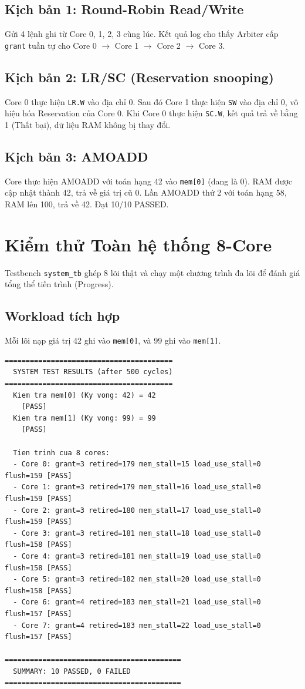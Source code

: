 \subsection{Kịch bản 1: Round-Robin Read/Write}
Gửi 4 lệnh ghi từ Core 0, 1, 2, 3 cùng lúc. Kết quả log cho thấy Arbiter cấp \texttt{grant} tuần tự cho Core 0 $\rightarrow$ Core 1 $\rightarrow$ Core 2 $\rightarrow$ Core 3.
\subsection{Kịch bản 2: LR/SC (Reservation snooping)}
Core 0 thực hiện \texttt{LR.W} vào địa chỉ 0. Sau đó Core 1 thực hiện \texttt{SW} vào địa chỉ 0, vô hiệu hóa Reservation của Core 0. Khi Core 0 thực hiện \texttt{SC.W}, kết quả trả về bằng 1 (Thất bại), dữ liệu RAM không bị thay đổi.
\subsection{Kịch bản 3: AMOADD}
Core thực hiện AMOADD với toán hạng 42 vào \texttt{mem[0]} (đang là 0). RAM được cập nhật thành 42, trả về giá trị cũ 0. Lần AMOADD thứ 2 với toán hạng 58, RAM lên 100, trả về 42. Đạt 10/10 PASSED.

\section{Kiểm thử Toàn hệ thống 8-Core}
Testbench \texttt{system\_tb} ghép 8 lõi thật và chạy một chương trình đa lõi để đánh giá tổng thể tiến trình (Progress).

\subsection{Workload tích hợp}
Mỗi lõi nạp giá trị 42 ghi vào \texttt{mem[0]}, và 99 ghi vào \texttt{mem[1]}.
\begin{lstlisting}[caption={Kết quả kiểm thử toàn hệ thống}]
========================================
  SYSTEM TEST RESULTS (after 500 cycles)
========================================
  Kiem tra mem[0] (Ky vong: 42) = 42
    [PASS]
  Kiem tra mem[1] (Ky vong: 99) = 99
    [PASS]

  Tien trinh cua 8 cores:
  - Core 0: grant=3 retired=179 mem_stall=15 load_use_stall=0 flush=159 [PASS]
  - Core 1: grant=3 retired=179 mem_stall=16 load_use_stall=0 flush=159 [PASS]
  - Core 2: grant=3 retired=180 mem_stall=17 load_use_stall=0 flush=159 [PASS]
  - Core 3: grant=3 retired=181 mem_stall=18 load_use_stall=0 flush=158 [PASS]
  - Core 4: grant=3 retired=181 mem_stall=19 load_use_stall=0 flush=158 [PASS]
  - Core 5: grant=3 retired=182 mem_stall=20 load_use_stall=0 flush=158 [PASS]
  - Core 6: grant=4 retired=183 mem_stall=21 load_use_stall=0 flush=157 [PASS]
  - Core 7: grant=4 retired=183 mem_stall=22 load_use_stall=0 flush=157 [PASS]

==========================================
  SUMMARY: 10 PASSED, 0 FAILED
==========================================
\end{lstlisting}


